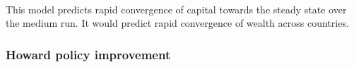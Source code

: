 \documentclass[11pt]{article}
\begin{document}
    \begin{center}
    \end{center}
    { \hspace*{\fill} \\}
    
    This model predicts rapid convergence of capital towards the steady
state over the medium run. It would predict rapid convergence of wealth
across countries.

    \hypertarget{howard-policy-improvement}{%
\subsubsection{Howard policy
improvement}\label{howard-policy-improvement}}
\end{document}

